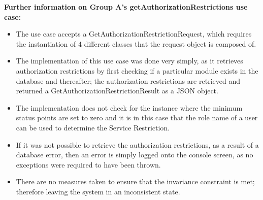\textbf{Further information on Group A's getAuthorizationRestrictions
 use case:}
\begin{itemize}
	\item The use case accepts a GetAuthorizationRestrictionRequest, which requires the instantiation of 4 different classes that the request object is composed of.

\item The implementation of this use case was done very simply, as it retrieves authorization restrictions by first checking if a particular module exists in the database and thereafter; the authorization restrictions are retrieved and returned a GetAuthorizationRestrictionResult as a JSON object.

\item The implementation does not check for the instance where the minimum status points are set to zero and it is in this case that the role name of a user can be used to determine the Service Restriction. 

\item If it was not possible to retrieve the authorization restrictions, as a result of a database error, then an error is simply logged onto the console screen, as no exceptions were required to have been thrown.

\item There are no measures taken to ensure that the invariance constraint is met; therefore leaving the system in an inconsistent state.

\end{itemize}





